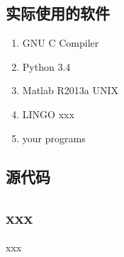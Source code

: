 \documentclass[10pt,a4paper]{article}
\begin{document}
\begin{CJK}{UTF8}{gbsn}
\subsection{实际使用的软件}
\begin{enumerate}
	\item GNU C Compiler
	\item Python 3.4
	\item Matlab R2013a UNIX
	\item LINGO xxx
	\item your programs
\end{enumerate}
\subsection{源代码}
\subsection{xxx}
xxx

\end{CJK}
\end{document}
